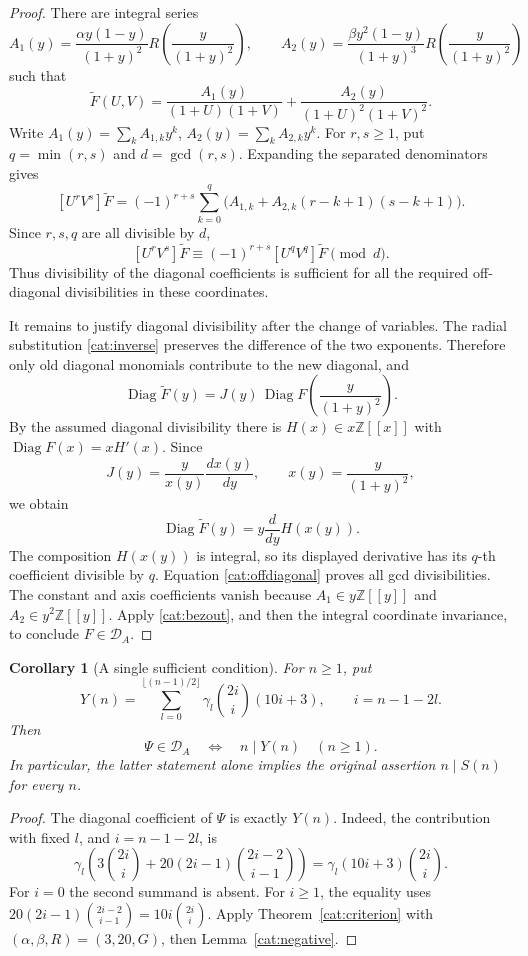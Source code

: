 \documentclass[11pt,a4paper]{article}
\newtheorem{corollary}[theorem]{Corollary}
\theoremstyle{remark}\newtheorem{remark}[theorem]{Remark}
\newcommand{\Z}{\mathbb Z}
\begin{document}
\begin{proof}
There are integral series
\[
 A_1(y)=\frac{\alpha y(1-y)}{(1+y)^2}
          R\left(\frac{y}{(1+y)^2}\right),\qquad
 A_2(y)=\frac{\beta y^2(1-y)}{(1+y)^3}
          R\left(\frac{y}{(1+y)^2}\right)
\]
such that
\begin{equation}\label{cat:separated}
 \widetilde F(U,V)=
 \frac{A_1(y)}{(1+U)(1+V)}
 +\frac{A_2(y)}{(1+U)^2(1+V)^2}.
\end{equation}
Write \(A_1(y)=\sum_k A_{1,k} y^k\), \(A_2(y)=\sum_k A_{2,k} y^k\).
For \(r,s\ge1\), put \(q=\min(r,s)\) and \(d=\gcd(r,s)\).
Expanding the separated denominators gives
\[
 [U^rV^s]\widetilde F
 =(-1)^{r+s}\sum_{k=0}^q
       \bigl(A_{1,k}+A_{2,k}(r-k+1)(s-k+1)\bigr).
\]
Since \(r,s,q\) are all divisible by \(d\),
\begin{equation}\label{cat:offdiagonal}
 [U^rV^s]\widetilde F
 \equiv(-1)^{r+s}[U^qV^q]\widetilde F\pmod d.
\end{equation}
Thus divisibility of the diagonal coefficients is sufficient for all
the required off-diagonal divisibilities in these coordinates.

It remains to justify diagonal divisibility after the change of variables.
The radial substitution \eqref{cat:inverse} preserves the difference of
the two exponents. Therefore only old diagonal monomials contribute to
the new diagonal, and
\[
 \operatorname{Diag}\widetilde F(y)
 =J(y)\,\operatorname{Diag}F\left(\frac{y}{(1+y)^2}\right).
\]
By the assumed diagonal divisibility there is \(H(x)\in x\Z[[x]]\)
with \(\operatorname{Diag}F(x)=xH'(x)\). Since
\[
 J(y)=\frac{y}{x(y)}\frac{dx(y)}{dy},\qquad
 x(y)=\frac{y}{(1+y)^2},
\]
we obtain
\[
 \operatorname{Diag}\widetilde F(y)
 =y\frac{d}{dy}H(x(y)).
\]
The composition \(H(x(y))\) is integral, so its displayed derivative
has its \(q\)-th coefficient divisible by \(q\). Equation
\eqref{cat:offdiagonal} proves all gcd divisibilities. The constant and
axis coefficients vanish because \(A_1\in y\Z[[y]]\) and
\(A_2\in y^2\Z[[y]]\). Apply \eqref{cat:bezout}, and then the integral
coordinate invariance, to conclude \(F\in\mathcal D_A\).
\end{proof}

\begin{corollary}[A single sufficient condition]\label{cat:single}
For \(n\ge1\), put
\[
 Y(n)=\sum_{l=0}^{\lfloor(n-1)/2\rfloor}
  \gamma_l\binom{2i}{i}(10i+3),\qquad i=n-1-2l.
\]
Then
\[
 \Psi\in\mathcal D_A
 \quad\Longleftrightarrow\quad n\mid Y(n)\quad(n\ge1).
\]
In particular, the latter statement alone implies the original assertion
\(n\mid S(n)\) for every \(n\).
\end{corollary}
\begin{proof}
The diagonal coefficient of \(\Psi\) is exactly \(Y(n)\). Indeed, the
contribution with fixed \(l\), and \(i=n-1-2l\), is
\[
 \gamma_l\left(3\binom{2i}{i}
       +20(2i-1)\binom{2i-2}{i-1}\right)
 =\gamma_l(10i+3)\binom{2i}{i}.
\]
For \(i=0\) the second summand is absent. For \(i\ge1\), the equality
uses \(20(2i-1)\binom{2i-2}{i-1}=10i\binom{2i}{i}\).
Apply Theorem~\ref{cat:criterion} with
\((\alpha,\beta,R)=(3,20,G)\), then Lemma~\ref{cat:negative}.
\end{proof}
\end{document}
